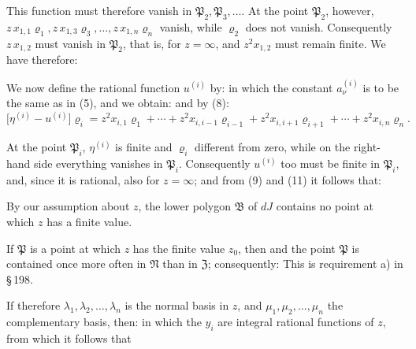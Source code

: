 This function must therefore vanish in $\mathfrak P_2,\allowbreak \mathfrak P_3,\allowbreak \ldots$. At the point $\mathfrak P_2$, however, $z\,x_{1,1}\varrho_1,\allowbreak z\,x_{1,3}\varrho_3,\allowbreak \ldots,\allowbreak z\,x_{1,n}\varrho_n$ vanish, while $\varrho_2$ does not vanish. Consequently $z\,x_{1,2}$ must vanish in $\mathfrak P_2$, that is, for $z=\infty$, and $z^2 x_{1,2}$ must remain finite. We have therefore:


We now define the rational function $u^{(i)}$ by:
in which the constant $a^{(i)}_\nu$ is to be the same as in (5), and we obtain:
and by (8):
\[
\bigl[\eta^{(i)} - u^{(i)}\bigr]\varrho_i = z^2 x_{i,1}\varrho_1 + \cdots + z^2 x_{i,i-1}\varrho_{i-1} + z^2 x_{i,i+1}\varrho_{i+1} + \cdots + z^2 x_{i,n}\varrho_n.
\]

At the point $\mathfrak P_i$, $\eta^{(i)}$ is finite and $\varrho_i$ different from zero, while on the right-hand side everything vanishes in $\mathfrak P_i$. Consequently $u^{(i)}$ too must be finite in $\mathfrak P_i$, and, since it is rational, also for $z=\infty$; and from (9) and (11) it follows that:

By our assumption about $z$, the lower polygon $\mathfrak B$ of $dJ$ contains no point at which $z$ has a finite value.

If $\mathfrak P$ is a point at which $z$ has the finite value $z_0$, then
and the point $\mathfrak P$ is contained once more often in $\mathfrak N$ than in $\mathfrak Z$; consequently:
This is requirement a) in \S\,198.

If therefore $\lambda_1, \lambda_2, \ldots, \lambda_n$ is the normal basis in $z$, and $\mu_1, \mu_2, \ldots, \mu_n$ the complementary basis, then:
in which the $y_i$ are integral rational functions of $z$, from which it follows that
